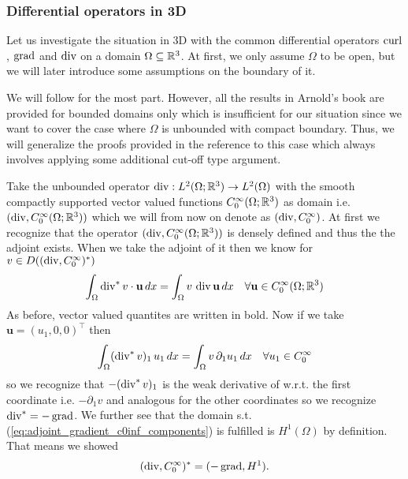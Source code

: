 \documentclass[../main.tex]{subfiles}
\begin{document}
\subsubsection{Differential operators in 3D}\label{sec:adjoints_differential_operators_3d}

Let us investigate the situation in 3D with the common differential 
operators $\operatorname{curl}$, $\operatorname{grad}$ and $\operatorname{div}$ on a domain $\Omega \subseteq \mathbb{R}^3$. 
At first, we only assume  $\Omega$ to be open, but we will later 
introduce some assumptions on the boundary of it. 


We will follow \cite[Sec.\,3.4]{arnold} for the most part. However, all the results in Arnold's book 
are provided for bounded domains only which is insufficient for our situation since 
we want to cover the case where $\Omega$ is unbounded with compact boundary. Thus, 
we will generalize the proofs provided in the reference to this case which always involves 
applying some additional cut-off type argument.

Take the unbounded operator 
$\operatorname{div}: L^2(\Omega;\mathbb{R}^3) \rightarrow L^2(\Omega)$ with the smooth compactly supported 
vector valued functions
$C_0^\infty(\Omega;\mathbb{R}^3)$ as domain i.e. $(\operatorname{div}, C_0^\infty(\Omega;\mathbb{R}^3))$ which 
we will from now on denote as $(\operatorname{div}, C_0^\infty)$. At first we recognize that 
the operator $(\operatorname{div}, C_0^\infty(\Omega;\mathbb{R}^3))$ is densely defined and thus the the adjoint exists.
When we take the adjoint of it then we know for $v \in 
D((\operatorname{div}, C_0^\infty)^*)$
\begin{align*}
    \int_\Omega \operatorname{div} ^* v \cdot \mathbf{u} \, dx
    = \int_\Omega v \, \operatorname{div} \mathbf{u} \, dx \quad \forall 
    \mathbf{u} \in C_0^\infty(\Omega;\mathbb{R}^3)
\end{align*}
As before, vector valued quantites are written in bold.
Now if we take $\mathbf{u} = (u_1,0,0)^\top$ then 
\begin{align}
    \int_\Omega (\operatorname{div} ^* v)_1 \, u_1 \, dx
    = \int_\Omega v \, \partial_1 u_1 \, dx \quad 
        \forall u_1 \in C_0^\infty \label{eq:adjoint_gradient_c0inf_components}
\end{align}
so we recognize that $-(\operatorname{div} ^* v)_1$ is the weak derivative of w.r.t. the 
first coordinate i.e. $-\partial_1 v$ and analogous for the other coordinates 
so we recognize $\operatorname{div}^* = -\operatorname{grad}$. We further see that the
domain s.t. (\ref{eq:adjoint_gradient_c0inf_components}) is fulfilled is $H^1(\Omega)$ 
by definition. That means we showed 
\begin{align}
    (\operatorname{div}, C_0^\infty)^* = (-\operatorname{grad}, H^1). \label{eq:adjoint_gradient_c0inf} 
\end{align}
\end{document}
